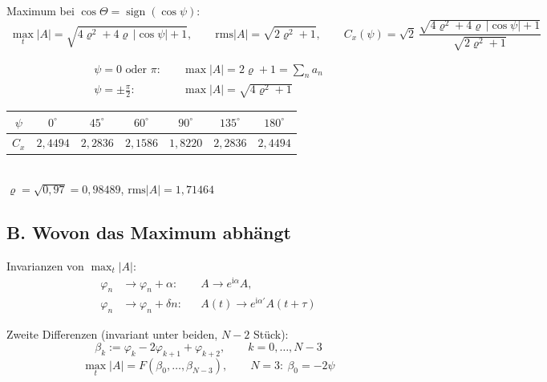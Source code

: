 Maximum bei $\cos\Theta=\operatorname{sign}(\cos\psi)$:
\begin{equation}
  \boxed{\;
  \max_t|A| = \sqrt{4\varrho^2+4\varrho\,|\cos\psi|+1},\qquad
  \mathrm{rms}|A| = \sqrt{2\varrho^2+1},\qquad
  C_x(\psi) = \sqrt2\,\frac{\sqrt{4\varrho^2+4\varrho\,|\cos\psi|+1}}{\sqrt{2\varrho^2+1}}
  \;}
  \label{eq:cf-crestpsi}
\end{equation}

\begin{align}
  \psi = 0 \text{ oder } \pi:&\quad \max|A| = 2\varrho+1 = \textstyle\sum_n a_n\\
  \psi = \pm\tfrac{\pi}{2}:&\quad \max|A| = \sqrt{4\varrho^2+1}
\end{align}

\begin{center}
\begin{tabular}{c|cccccc}
  \hline
  $\psi$ & $0^\circ$ & $45^\circ$ & $60^\circ$ & $90^\circ$ & $135^\circ$ & $180^\circ$\\
  \hline
  $C_x$ & $2{,}4494$ & $2{,}2836$ & $2{,}1586$ & $1{,}8220$ & $2{,}2836$ & $2{,}4494$\\
  \hline
\end{tabular}
\\[2pt]
{\small $\varrho=\sqrt{0{,}97}=0{,}98489$, $\mathrm{rms}|A|=1{,}71464$}
\end{center}

\subsection*{B. Wovon das Maximum abh\"angt}

Invarianzen von $\max_t|A|$:
\begin{align}
  \varphi_n &\to \varphi_n+\alpha: && A\to e^{\mathrm{i}\alpha}A,\\
  \varphi_n &\to \varphi_n+\delta n: && A(t)\to e^{\mathrm{i}\alpha'}A(t+\tau)
\end{align}

Zweite Differenzen (invariant unter beiden, $N-2$ St\"uck):
\begin{equation}
  \beta_k := \varphi_k - 2\varphi_{k+1} + \varphi_{k+2},\qquad k=0,\dots,N-3
  \label{eq:cf-beta}
\end{equation}
\begin{equation}
  \max_t|A| = F(\beta_0,\dots,\beta_{N-3}),\qquad
  N=3:\ \beta_0 = -2\psi
\end{equation}

